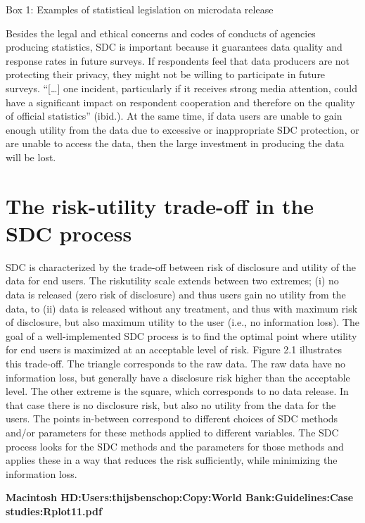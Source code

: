 \documentclass[letterpaper,10pt,english]{sphinxmanual}
\begin{document}
Box 1: Examples of statistical legislation on microdata release

Besides the legal and ethical concerns and codes of conducts of agencies
producing statistics, SDC is important because it guarantees data
quality and response rates in future surveys. If respondents feel that
data producers are not protecting their privacy, they might not be
willing to participate in future surveys. “{[}…{]} one incident,
particularly if it receives strong media attention, could have a
significant impact on respondent cooperation and therefore on the
quality of official statistics” (ibid.). At the same time, if data users
are unable to gain enough utility from the data due to excessive or
inappropriate SDC protection, or are unable to access the data, then the
large investment in producing the data will be lost.


\section{The risk-utility trade-off in the SDC process}
\label{\detokenize{SDC_intro:the-risk-utility-trade-off-in-the-sdc-process}}
SDC is characterized by the trade-off between risk of disclosure and
utility of the data for end users. The risk\textendash{}utility scale extends
between two extremes; (i) no data is released (zero risk of disclosure)
and thus users gain no utility from the data, to (ii) data is released
without any treatment, and thus with maximum risk of disclosure, but
also maximum utility to the user (i.e., no information loss). The goal
of a well-implemented SDC process is to find the optimal point where
utility for end users is maximized at an acceptable level of risk.
Figure 2.1 illustrates this trade-off. The triangle corresponds to the
raw data. The raw data have no information loss, but generally have a
disclosure risk higher than the acceptable level. The other extreme is
the square, which corresponds to no data release. In that case there is
no disclosure risk, but also no utility from the data for the users. The
points in-between correspond to different choices of SDC methods and/or
parameters for these methods applied to different variables. The SDC
process looks for the SDC methods and the parameters for those methods
and applies these in a way that reduces the risk sufficiently, while
minimizing the information loss.

{\color{red}\bfseries{}\textbar{}Macintosh HD:Users:thijsbenschop:Copy:World Bank:Guidelines:Case
studies:Rplot11.pdf\textbar{}}
\end{document}
